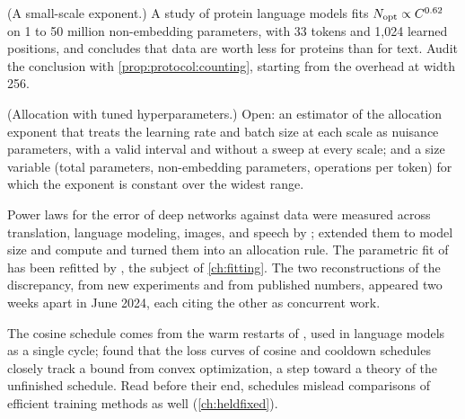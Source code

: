 \begin{refsection}
\begin{exercises}
\item \critique (A small-scale exponent.) A study of protein language models fits $N_{\mathrm{opt}}\propto C^{0.62}$ on 1 to 50 million non-embedding parameters, with 33 tokens and 1,024 learned positions, and concludes that data are worth less for proteins than for text. Audit the conclusion with \cref{prop:protocol:counting}, starting from the overhead at width 256.\label{ex:protocol:critique2}

\item \research (Allocation with tuned hyperparameters.) Open: an estimator of the allocation exponent that treats the learning rate and batch size at each scale as nuisance parameters, with a valid interval and without a sweep at every scale; and a size variable (total parameters, non-embedding parameters, operations per token) for which the exponent is constant over the widest range.\label{ex:protocol:research}
\end{exercises}

\notesandrefs
Power laws for the error of deep networks against data were measured across translation, language modeling, images, and speech by \textcite{HestnessEtAl2017}; \textcite{KaplanEtAl2020} extended them to model size and compute and turned them into an allocation rule. The parametric fit of \textcite{HoffmannEtAl2022} has been refitted by \textcite{BesirogluEtAl2024}, the subject of \cref{ch:fitting}. The two reconstructions of the discrepancy, \textcite{PorianEtAl2024} from new experiments and \textcite{PearceSong2024} from published numbers, appeared two weeks apart in June 2024, each citing the other as concurrent work.

The cosine schedule comes from the warm restarts of \textcite{LoshchilovHutter2017}, used in language models as a single cycle; \textcite{SchaippEtAl2025} found that the loss curves of cosine and cooldown schedules closely track a bound from convex optimization, a step toward a theory of the unfinished schedule. Read before their end, schedules mislead comparisons of efficient training methods as well (\cref{ch:heldfixed}).


\end{refsection}
